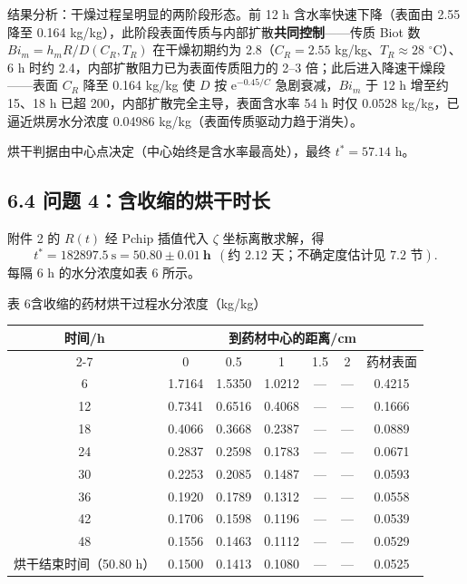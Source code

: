 \documentclass[12pt,a4paper]{ctexart}
\begin{document}
结果分析：干燥过程呈明显的两阶段形态。前 12 h 含水率快速下降（表面由 2.55 降至 0.164 kg/kg），此阶段表面传质与内部扩散\textbf{共同控制}——传质 Biot 数 $Bi_m=h_mR/D(C_R,T_R)$ 在干燥初期约为 2.8（$C_R=2.55$ kg/kg、$T_R\approx28$ $^\circ$C）、6 h 时约 2.4，内部扩散阻力已为表面传质阻力的 2--3 倍；此后进入降速干燥段——表面 $C_R$ 降至 0.164 kg/kg 使 $D$ 按 $\mathrm{e}^{-0.45/C}$ 急剧衰减，$Bi_m$ 于 12 h 增至约 15、18 h 已超 200，内部扩散完全主导，表面含水率 54 h 时仅 0.0528 kg/kg，已逼近烘房水分浓度 0.04986 kg/kg（表面传质驱动力趋于消失）。

烘干判据由中心点决定（中心始终是含水率最高处），最终 $t^*=57.14$ h。

\subsection{6.4 问题 4：含收缩的烘干时长}

附件 2 的 $R(t)$ 经 Pchip 插值代入 $\zeta$ 坐标离散求解，得
\begin{equation}
t^*=182897.5\ \mathrm{s}=\mathbf{50.80\pm0.01\ h}\ \ (\text{约 2.12 天；不确定度估计见 7.2 节}).
\end{equation}
每隔 6 h 的水分浓度如表 6 所示。

\begin{center}
\begin{minipage}{\textwidth}
\centering
{\heiti{} 表 6\quad 含收缩的药材烘干过程水分浓度（kg/kg）}
\par\medskip
{\begin{tabular}{ccccccc}
\toprule
时间/h & \multicolumn{6}{c}{到药材中心的距离/cm} \\
\cmidrule(lr){2-7}
 & 0 & 0.5 & 1 & 1.5 & 2 & 药材表面 \\
\midrule
6     & 1.7164 & 1.5350 & 1.0212 & --- & --- & 0.4215 \\
12    & 0.7341 & 0.6516 & 0.4068 & --- & --- & 0.1666 \\
18    & 0.4066 & 0.3668 & 0.2387 & --- & --- & 0.0889 \\
24    & 0.2837 & 0.2598 & 0.1783 & --- & --- & 0.0671 \\
30    & 0.2253 & 0.2085 & 0.1487 & --- & --- & 0.0593 \\
36    & 0.1920 & 0.1789 & 0.1312 & --- & --- & 0.0558 \\
42    & 0.1706 & 0.1598 & 0.1196 & --- & --- & 0.0539 \\
48    & 0.1556 & 0.1463 & 0.1112 & --- & --- & 0.0529 \\
烘干结束时间（50.80 h） & 0.1500 & 0.1413 & 0.1080 & --- & --- & 0.0525 \\
\bottomrule
\end{tabular}}
\end{minipage}
\end{center}
\end{document}
